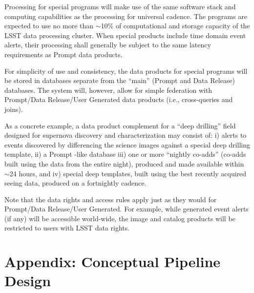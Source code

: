 \documentclass[SE,lsstdraft,toc]{lsstdoc}
\begin{document}
Processing for special programs will make use of the same software stack and computing capabilities as the processing for universal cadence. The programs are expected to use no more than $\sim$10\% of computational and storage capacity of the LSST data processing cluster. When special products include time domain event alerts, their processing shall generally be subject to the same latency requirements as Prompt data products.

For simplicity of use and consistency, the data products for special programs will be stored in databases separate from the ``main'' (Prompt and Data Release) databases. The system will, however, allow for simple federation with Prompt/Data Release/User Generated data products (i.e., cross-queries and joins).

As a concrete example, a data product complement for a ``deep drilling'' field designed for supernova discovery and characterization may consist of: i) alerts to events discovered by differencing the science images against a special deep drilling template, ii) a Prompt -like database iii) one or more ``nightly co-adds'' (co-adds built using the data from the entire night), produced and made available within $\sim$24 hours, and iv) special deep templates, built using the best recently acquired seeing data, produced on a fortnightly cadence.

Note that the data rights and access rules apply just as they would for Prompt/Data Release/User Generated. For example, while generated event alerts (if any) will be accessible world-wide, the image and catalog products will be restricted to users with LSST data rights.




\clearpage
\appendix
\section{Appendix: Conceptual Pipeline Design \label{sec:scipi}}
\end{document}
